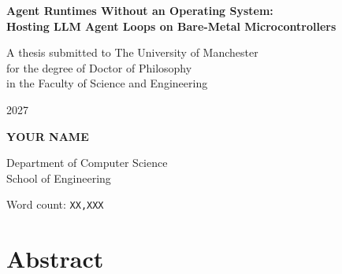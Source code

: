 \documentclass[12pt,a4paper]{report}
\newcommand{\thesistitle}{Agent Runtimes Without an Operating System:\\
Hosting LLM Agent Loops on Bare-Metal Microcontrollers}
\newcommand{\candidatename}{YOUR NAME}
\newcommand{\submissionyear}{2027}
\begin{document}
\begin{titlepage}
  \centering
  \vspace*{20mm}
  {\LARGE\bfseries \thesistitle \par}
  \vfill
  {\large A thesis submitted to The University of Manchester\\
   for the degree of Doctor of Philosophy\\
   in the Faculty of Science and Engineering\par}
  \vspace{15mm}
  {\large \submissionyear \par}
  \vspace{15mm}
  {\large\bfseries \candidatename \par}
  \vspace{5mm}
  {\large Department of Computer Science\\
   School of Engineering\par}
\end{titlepage}

\tableofcontents
\listoffigures
\listoftables

\cleardoublepage
\noindent Word count: \texttt{XX,XXX}

\cleardoublepage
\chapter*{Abstract}
\end{document}
